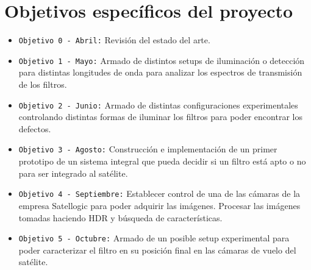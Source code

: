 \documentclass{ctuthesis}
\begin{document}

\section*{Objetivos específicos del proyecto}
\begin{itemize}
	
	\item \texttt{Objetivo 0 - Abril:} Revisión del estado del arte.
	\item \texttt{Objetivo 1 - Mayo:} Armado de distintos setups de iluminación 
	o detección para distintas longitudes de onda para analizar los espectros 
	de transmisión de los filtros.
	\item \texttt{Objetivo 2 - Junio:} Armado de distintas configuraciones 
	experimentales controlando distintas formas de iluminar los filtros
	para poder encontrar los defectos.
	\item \texttt{Objetivo 3 - Agosto:} Construcción e implementación de un primer prototipo de un sistema integral que pueda decidir si un filtro está apto o no para ser integrado al satélite.
	\item \texttt{Objetivo 4 - Septiembre:} Establecer control de una de las cámaras de la empresa Satellogic para poder adquirir las
	imágenes. Procesar las imágenes tomadas haciendo HDR y búsqueda de características.
	\item \texttt{Objetivo 5 - Octubre:} Armado de un posible setup 
	experimental para poder caracterizar el filtro en su posición final
	en las cámaras de vuelo del satélite.
\end{itemize}
\end{document}
